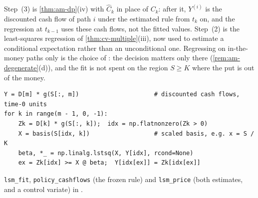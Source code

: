 Step~(3) is \cref{thm:am-dp}(iv) with $\hat C_k$ in place of $C_k$: after it, $Y^{(i)}$ is the
discounted cash flow of path $i$ under the estimated rule from $t_k$ on, and the regression
at $t_{k-1}$ uses these cash flows, not the fitted values. Step~(2) is the least-squares
regression of \cref{thm:cv-multiple}(iii), now used to estimate a conditional expectation
rather than an unconditional one. Regressing on in-the-money paths only is the choice of
\textcite{longstaff-schwartz}: the decision matters only there (\cref{rem:am-degenerate}(d)),
and the fit is not spent on the region $S\ge K$ where the put is out of the money.

\begin{incode}
\begin{lstlisting}
Y = D[m] * g(S[:, m])                     # discounted cash flows, time-0 units
for k in range(m - 1, 0, -1):
    Zk = D[k] * g(S[:, k]);  idx = np.flatnonzero(Zk > 0)
    X = basis(S[idx, k])                  # scaled basis, e.g. x = S / K
    beta, *_ = np.linalg.lstsq(X, Y[idx], rcond=None)
    ex = Zk[idx] >= X @ beta;  Y[idx[ex]] = Zk[idx[ex]]
\end{lstlisting}
\texttt{lsm\_fit}, \texttt{policy\_cashflows} (the frozen rule) and \texttt{lsm\_price} (both
estimates, and a control variate) in .
\end{incode}

